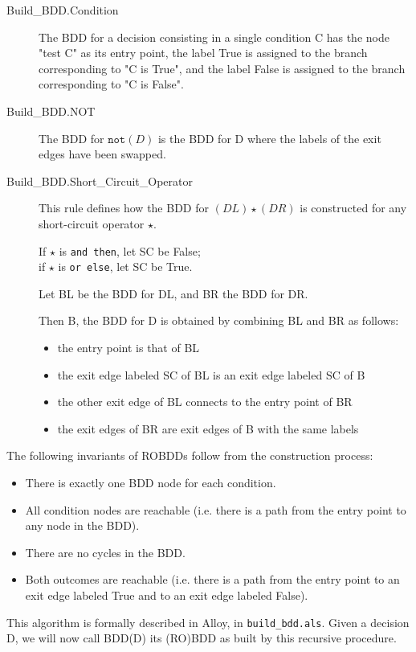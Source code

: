\documentclass[a4paper,12pt,twoside]{article}
\newcommand{\anysc}{\star}
\newcommand{\andthen}{\texttt{and then}}
\newcommand{\orelse}{\texttt{or else}}
\newcommand{\adanot}{\texttt{not}}
\newcommand{\alloyspec}[1]{\texttt{#1}}
\begin{document}
\begin{description}
\item[Build\_BDD.Condition]
  The BDD for a decision consisting in a single condition C has the node
  "test C" as its entry point, the label True is assigned to the branch
  corresponding to "C is True", and the label False is assigned to the
  branch corresponding to "C is False".

\item[Build\_BDD.NOT]
  The BDD for $\adanot{} (D)$ is the BDD for D where the labels of the exit
  edges have been swapped.

\item[Build\_BDD.Short\_Circuit\_Operator]
  This rule defines how the BDD for $(DL) \anysc{} (DR)$ is constructed for
  any short-circuit operator $\anysc{}$.

  If $\anysc{}$ is \andthen{}, let SC be False;\\
  if $\anysc{}$ is \orelse{}, let SC be True.

  Let BL be the BDD for DL, and BR the BDD for DR.

  Then B, the BDD for D is obtained by combining BL and BR as follows:
  \begin{itemize}
    \item the entry point is that of BL
    \item the exit edge labeled SC of BL is an exit edge labeled SC of B
    \item the other exit edge of BL connects to the entry point of BR
    \item the exit edges of BR are exit edges of B with the same labels
  \end{itemize}
\end{description}

The following invariants of ROBDDs follow from the construction process:
\begin{itemize}
  \item There is exactly one BDD node for each condition.
  \item All condition nodes are reachable (i.e. there is a path from
        the entry point to any node in the BDD).
  \item There are no cycles in the BDD.
  \item Both outcomes are reachable (i.e. there is a path from the entry point
        to an exit edge labeled True and to an exit edge labeled False).
\end{itemize}

This algorithm is formally described in Alloy, in \alloyspec{build\_bdd.als}.
Given a decision D, we will now call BDD(D) its (RO)BDD as built by this
recursive procedure.
\end{document}
